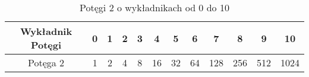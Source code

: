 \begin{table}[h]
\centering
\begin{tabular}{|c|c|c|c|c|c|c|c|c|c|c|c|}
\hline
Wykładnik Potęgi & 0 & 1 & 2 & 3 & 4  & 5  & 6  & 7   & 8   & 9   & 10   \\ \hline
Potęga 2         & 1 & 2 & 4 & 8 & 16 & 32 & 64 & 128 & 256 & 512 & 1024 \\ \hline
\end{tabular}
\caption {Potęgi 2 o wykładnikach od 0 do 10}
\end{table}